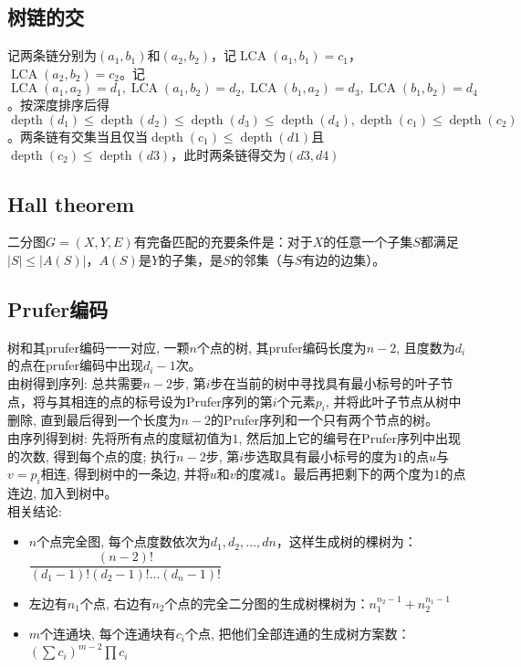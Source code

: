 \newcommand{\lca}{\operatorname{LCA}}
\newcommand{\depth}{\operatorname{depth}}
\subsection*{树链的交}
    记两条链分别为$( a_1, b_1 )$和$( a_2, b_2 )$，记$\lca(a_1, b_1) = c_1$，$\lca(a_2, b_2) = c_2$。记$\lca(a_1, a_2) = d_1, \lca(a_1, b_2) = d_2, \lca(b_1, a_2) = d_3, \lca(b_1, b_2) = d_4$。按深度排序后得$\depth(d_1) \le \depth(d_2) \le \depth(d_3) \le \depth(d_4), \depth(c_1) \le \depth(c_2)$。两条链有交集当且仅当$\depth(c_1) \le \depth(d1)$且$\depth(c_2) \le \depth(d3)$，此时两条链得交为$( d3, d4 )$

\subsection*{Hall theorem}
    二分图$ G = (X, Y, E) $有完备匹配的充要条件是：对于$ X $的任意一个子集$ S $都满足$ \left| S \right| \leq \left| A(S) \right| $，$ A(S) $是$ Y $的子集，是$ S $的邻集（与$ S $有边的边集）。

\subsection*{Prufer编码}
    树和其prufer编码一一对应, 一颗$ n $个点的树, 其prufer编码长度为$ n − 2 $, 且度数为$ d_i $的点在prufer编码中出现$ d_i − 1 $次。
    \\由树得到序列: 总共需要$ n − 2 $步, 第$ i $步在当前的树中寻找具有最小标号的叶子节点，将与其相连的点的标号设为Prufer序列的第$ i $个元素$ p_i $, 并将此叶子节点从树中删除, 直到最后得到一个长度为$ n − 2 $的Prufer序列和一个只有两个节点的树。
    \\由序列得到树: 先将所有点的度赋初值为$ 1 $, 然后加上它的编号在Prufer序列中出现的次数, 得到每个点的度; 执行$ n − 2 $步, 第$ i $步选取具有最小标号的度为$ 1 $的点$ u $与$ v = p_i$相连, 得到树中的一条边, 并将$ u $和$ v $的度减$ 1 $。最后再把剩下的两个度为$ 1 $的点连边, 加入到树中。
    \\相关结论:
    \begin{itemize}[wide=0pt]
        \item $ n $个点完全图, 每个点度数依次为$ d_1, d_2 , \dots, dn $，这样生成树的棵树为：$ \dfrac{(n - 2) !}{(d_1 - 1)! (d_2 - 1)! \dots (d_n - 1)!} $
        \item 左边有$ n_1 $个点, 右边有$ n_2 $个点的完全二分图的生成树棵树为：$ n_1^{n_2 - 1} + n_2^{n_1 - 1} $
        \item $ m $个连通块, 每个连通块有$ c_i $个点, 把他们全部连通的生成树方案数：$ (\sum c_i)^{m - 2} \prod c_i $
    \end{itemize}

